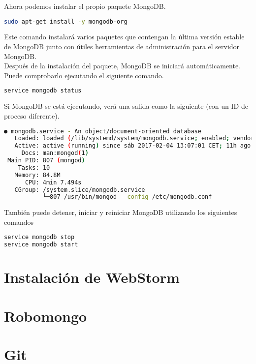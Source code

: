 Ahora podemos instalar el propio paquete MongoDB.

\begin{lstlisting}[language=bash]
sudo apt-get install -y mongodb-org
\end{lstlisting}

Este comando instalará varios paquetes que contengan la última versión estable de MongoDB junto con útiles herramientas de administración para el servidor MongoDB.\\

Después de la instalación del paquete, MongoDB se iniciará automáticamente. Puede comprobarlo ejecutando el siguiente comando.

\begin{lstlisting}[language=bash]
service mongodb status
\end{lstlisting}

Si MongoDB se está ejecutando, verá una salida como la siguiente (con un ID de proceso diferente).

\begin{lstlisting}[language=bash]
● mongodb.service - An object/document-oriented database
   Loaded: loaded (/lib/systemd/system/mongodb.service; enabled; vendor preset: enabled)
   Active: active (running) since sáb 2017-02-04 13:07:01 CET; 11h ago
     Docs: man:mongod(1)
 Main PID: 807 (mongod)
    Tasks: 10
   Memory: 84.8M
      CPU: 4min 7.494s
   CGroup: /system.slice/mongodb.service
           └─807 /usr/bin/mongod --config /etc/mongodb.conf
\end{lstlisting}

También puede detener, iniciar y reiniciar MongoDB utilizando los siguientes comandos

\begin{lstlisting}[language=bash]
service mongodb stop
service mongodb start
\end{lstlisting}


\section{Instalación de WebStorm}



\section{Robomongo}



\section{Git}


